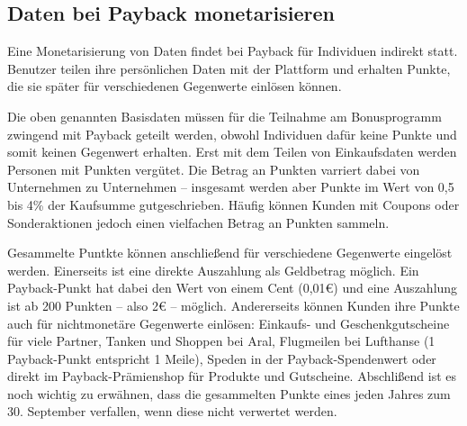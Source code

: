 \subsection{Daten bei Payback monetarisieren}
Eine Monetarisierung von Daten findet bei Payback für Individuen indirekt statt. Benutzer teilen ihre persönlichen Daten mit der Plattform und erhalten Punkte, die sie später für verschiedenen Gegenwerte einlösen können. \newline

\noindent Die oben genannten Basisdaten müssen für die Teilnahme am Bonusprogramm zwingend mit Payback geteilt werden, obwohl Individuen dafür keine Punkte und somit keinen Gegenwert erhalten. Erst mit dem Teilen von Einkaufsdaten werden Personen mit Punkten vergütet. Die Betrag an Punkten varriert dabei von Unternehmen zu Unternehmen -- insgesamt werden aber Punkte im Wert von 0,5 bis 4\% der Kaufsumme gutgeschrieben. Häufig können Kunden mit Coupons oder Sonderaktionen jedoch einen vielfachen Betrag an Punkten sammeln. \newline

\noindent Gesammelte Puntkte können anschließend für verschiedene Gegenwerte eingelöst werden. Einerseits ist eine direkte Auszahlung als Geldbetrag möglich. Ein Payback-Punkt hat dabei den Wert von einem Cent (0,01€) und eine Auszahlung ist ab 200 Punkten -- also 2€ -- möglich. \cite{Payback_Teilnahme} Andererseits können Kunden ihre Punkte auch für nichtmonetäre Gegenwerte einlösen: Einkaufs- und Geschenkgutscheine für viele Partner, Tanken und Shoppen bei Aral, Flugmeilen bei Lufthanse (1 Payback-Punkt entspricht 1 Meile), Speden in der Payback-Spendenwert oder direkt im Payback-Prämienshop für Produkte und Gutscheine. \cite{Payback_Einlösen} Abschlißend ist es noch wichtig zu erwähnen, dass die gesammelten Punkte eines jeden Jahres zum 30. September verfallen, wenn diese nicht verwertet werden. \cite{Payback_Teilnahme}